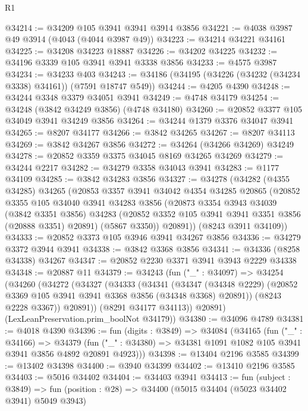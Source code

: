 \begin{lexlean}{R1}
\begin{coremodule}
@34214 := @34209 @105 @3941 @3941 @3914 @3856
@34221 := @4038 @3987 @49 @3914 (@4043 (@4044 @3987 @49))
@34223 := @34214 @34221 @34161
@34225 := @34208 @34223 @18887
@34226 := @34202 @34225
@34232 := @34196 @3339 @105 @3941 @3941 @3338 @3856
@34233 := @4575 @3987
@34234 := @34233 @403
@34243 := @34186 (@34195 (@34226 (@34232 (@34234 @3338) @34161)) (@7591 @18747 @549))
@34244 := @4205 @4390
@34248 := @34244 @3348 @3379 @34051 @3941
@34249 := @4748 @34179
@34254 := @34248 (@3842 @34249 @3856) (@4748 @34180)
@34260 := @20852 @3377 @105 @34049 @3941 @34249 @3856
@34264 := @34244 @1379 @3376 @34047 @3941
@34265 := @8207 @34177
@34266 := @3842 @34265
@34267 := @8207 @34113
@34269 := @3842 @34267 @3856
@34272 := @34264 (@34266 @34269) @34249
@34278 := @20852 @3359 @3375 @34045 @8169 @34265 @34269
@34279 := @34244 @2217
@34282 := @34279 @3358 @34043 @3941
@34283 := @1177 @34109
@34285 := @3842 @34283 @3856
@34327 := @34278
    (@34282
      (@4355 @34285)
      @34265
      (@20853
        @3357
        @3941
        @34042
        @4354
        @34285
        @20865
        (@20852
          @3355
          @105
          @34040
          @3941
          @34283
          @3856
          (@20873
            @3354
            @3943
            @34039
            (@3842 @3351 @3856)
            @34283
            (@20852 @3352 @105 @3941 @3941 @3351 @3856 (@20888 @3351) @20891)
            (@5867 @3350))
          @20891))
      (@8243 @3911 @34109))
@34333 := @20852 @3373 @105 @3946 @3941 @34267 @3856
@34336 := @34279 @3372 @3944 @3941
@34338 := @3842 @3368 @3856
@34341 := @34336 (@8258 @34338) @34267
@34347 := @20852 @2230 @3371 @3941 @3943 @2229 @34338
@34348 := @20887 @11
@34379 := @34243
    (fun ("_" : @34097) =>
    @34254
      (@34260
        (@34272
          (@34327
            (@34333
              (@34341
                (@34347
                  (@34348 @2229)
                  (@20852 @3369 @105 @3941 @3941 @3368 @3856 (@34348 @3368) @20891))
                (@8243 @2228 @3367))
              @20891))
          (@8291 @34177 @34113))
        @20891)
      (LexLeanPreservation.prim_boolNot @34179))
@34380 := @34096 @4789
@34381 := @4018 @4390
@34396 := fun (digits : @3849) =>
  @34084
    (@34165
      (fun ("_" : @34166) =>
      @34379 (fun ("_" : @34380) => @34381 @1091 @1082 @105 @3941 @3941 @3856 @4892 @20891 @4923)))
@34398 := @13404 @2196 @3585
@34399 := @13402 @34398
@34400 := @3940 @34399
@34402 := @13410 @2196 @3585
@34403 := @5016 @34402
@34404 := @34403 @3941
@34413 := fun (subject : @3849) =>
  fun (position : @28) => @34400 (@5015 @34404 (@5023 @34402 @3941) @5049 @3943)

\end{coremodule}
\end{lexlean}

